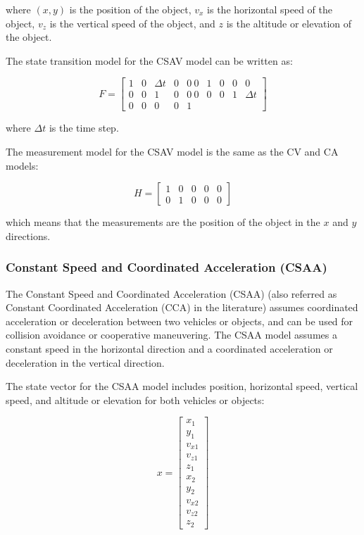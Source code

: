 where $(x,y)$ is the position of the object, $v_x$ is the horizontal speed of the object, $v_z$ is the vertical speed of the object, and $z$ is the altitude or elevation of the object.

The state transition model for the CSAV model can be written as:

\begin{equation}
	F = \begin{bmatrix}
		1 & 0 & \Delta t & 0 & 0 \ 0 & 1 & 0 & 0 & 0 \\ 
		0 & 0 & 1 & 0 & 0 \ 0 & 0 & 0 & 1 & \Delta t \\ 
		0 & 0 & 0 & 0 & 1
	\end{bmatrix}
\end{equation}

where $\Delta t$ is the time step.

The measurement model for the CSAV model is the same as the CV and CA models:

\begin{equation}
	H = \begin{bmatrix}
		1 & 0 & 0 & 0 & 0 \\ 
		0 & 1 & 0 & 0 & 0
	\end{bmatrix}
\end{equation}

which means that the measurements are the position of the object in the $x$ and $y$ directions.

\subsubsection{Constant Speed and Coordinated Acceleration (CSAA)}
\label{subsubsec:3_CSAA}

The Constant Speed and Coordinated Acceleration (CSAA) (also referred as Constant Coordinated Acceleration (CCA) in the literature) assumes coordinated acceleration or deceleration between two vehicles or objects, and can be used for collision avoidance or cooperative maneuvering. The CSAA model assumes a constant speed in the horizontal direction and a coordinated acceleration or deceleration in the vertical direction.

The state vector for the CSAA model includes position, horizontal speed, vertical speed, and altitude or elevation for both vehicles or objects:

\begin{equation}
	x = \begin{bmatrix}
		x_1 \\ 
		y_1 \\ 
		v_{x1} \\ 
		v_{z1} \\ 
		z_1 \\ 
		x_2 \\ 
		y_2 \\ 
		v_{x2} \\ 
		v_{z2} \\ 
		z_2\end{bmatrix}
\end{equation}

